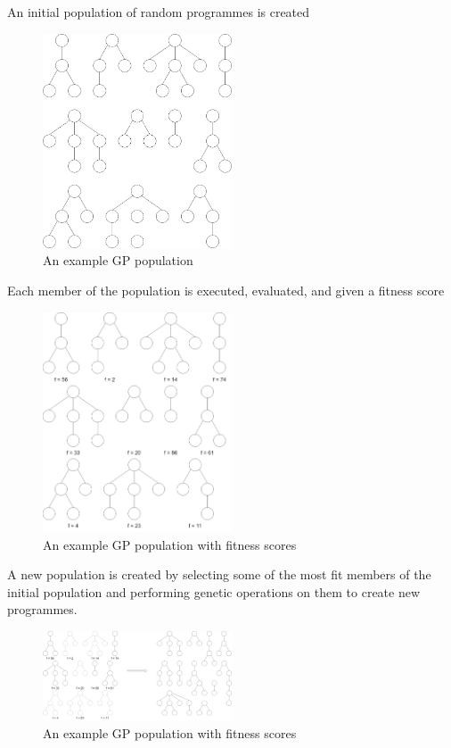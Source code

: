 \documentclass{article}
\begin{document}
			An initial population of random programmes is created
			
			\begin{figure}[H]
				\centering
				\includegraphics[width=0.5\textwidth]{2_gp_example_population}
				\caption{An example GP population}
			\end{figure}
		
			Each member of the population is executed, evaluated, and given a fitness score
			
			\begin{figure}[H]
				\centering
				\includegraphics[width=0.5\textwidth]{3_gp_example_fitness}
				\caption{An example GP population with fitness scores}
			\end{figure}
		
			A new population is created by selecting some of the most fit members of the initial population and performing genetic operations on them to create new programmes.
			
			\begin{figure}[H]
				\centering
				\includegraphics[width=0.5\textwidth]{4_gp_example_selection}
				\caption{An example GP population with fitness scores}
			\end{figure}
			
\end{document}
